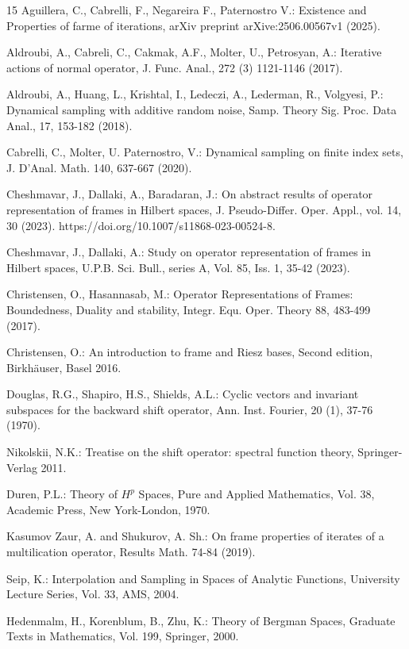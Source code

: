 \documentclass[12pt,titlepage]{amsart}
\theoremstyle{definition}
\theoremstyle{remark}
\begin{document}
\begin{thebibliography}{15}
Aguillera, C., Cabrelli, F., Negareira F., Paternostro V.:
Existence and Properties of farme of iterations, arXiv preprint
arXive:2506.00567v1 (2025).

Aldroubi, A., Cabreli, C., Cakmak, A.F., Molter, U., Petrosyan,
A.: Iterative actions of normal operator, J. Func. Anal., 272 (3)
1121-1146 (2017).

Aldroubi, A., Huang, L., Krishtal, I., Ledeczi, A., Lederman, R.,
Volgyesi, P.: Dynamical sampling with additive random noise, Samp.
Theory Sig. Proc. Data Anal., 17, 153-182 (2018).

Cabrelli, C., Molter, U. Paternostro, V.: Dynamical sampling on
finite index sets, J. D'Anal. Math. 140, 637-667 (2020).

Cheshmavar, J., Dallaki, A., Baradaran, J.: On abstract results of
operator representation of frames in Hilbert spaces, J.
Pseudo-Differ. Oper. Appl., vol. 14, 30 (2023).
https://doi.org/10.1007/s11868-023-00524-8.

Cheshmavar, J., Dallaki, A.: Study on operator representation of
frames in Hilbert spaces, U.P.B. Sci. Bull., series A, Vol. 85,
Iss. 1, 35-42 (2023).

Christensen, O., Hasannasab, M.: Operator Representations of
Frames: Boundedness, Duality and stability, Integr. Equ. Oper.
Theory 88, 483-499 (2017).

Christensen, O.: An introduction to frame and Riesz bases, Second
edition, Birkh\"{a}user, Basel 2016.

Douglas, R.G., Shapiro, H.S., Shields, A.L.: Cyclic vectors and
invariant subspaces for the backward shift operator, Ann. Inst.
Fourier, 20 (1), 37-76 (1970).

Nikolskii, N.K.: Treatise on the shift operator: spectral function
theory, Springer-Verlag 2011.

Duren, P.L.: Theory of $H^p$ Spaces, Pure and Applied Mathematics,
Vol. 38, Academic Press, New York-London, 1970.

Kasumov Zaur, A. and Shukurov, A. Sh.: On frame properties of
iterates of a multilication operator, Results Math. 74-84 (2019).

Seip, K.: Interpolation and Sampling in Spaces of Analytic
Functions, University Lecture Series, Vol. 33, AMS, 2004.

Hedenmalm, H., Korenblum, B., Zhu, K.: Theory of Bergman Spaces,
Graduate Texts in Mathematics, Vol. 199, Springer, 2000.



\end{thebibliography}
%

\end{document}
